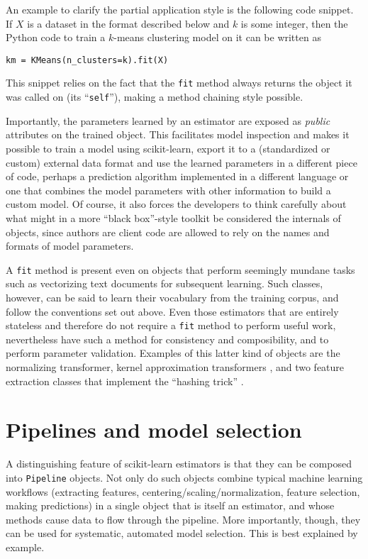 \documentclass[a4paper]{article}
\begin{document}
An example to clarify the partial application style
is the following code snippet.
If $X$ is a dataset in the format described below and $k$ is some integer,
then the Python code to train a $k$-means clustering model on it
can be written as
\begin{verbatim}
km = KMeans(n_clusters=k).fit(X)
\end{verbatim}
This snippet relies on the fact that the \texttt{fit} method
always returns the object it was called on (its ``\texttt{self}''),
making a method chaining style possible.

Importantly, the parameters learned by an estimator
are exposed as \textit{public} attributes on the trained object.
This facilitates model inspection
and makes it possible to train a model using scikit-learn,
export it to a (standardized or custom) external data format
and use the learned parameters in a different piece of code,
perhaps a prediction algorithm implemented in a different language
or one that combines the model parameters with other information
to build a custom model.
Of course, it also forces the developers to think carefully
about what might in a more ``black box''-style toolkit
be considered the internals of objects,
since authors are client code are allowed to rely
on the names and formats of model parameters.

A \texttt{fit} method is present even on objects
that perform seemingly mundane tasks such as vectorizing text documents
for subsequent learning.
Such classes, however, can be said to learn their vocabulary
from the training corpus,
and follow the conventions set out above.
Even those estimators that are entirely stateless and therefore
do not require a \texttt{fit} method to perform useful work,
nevertheless have such a method for consistency and composibility,
and to perform parameter validation.
Examples of this latter kind of objects are the normalizing transformer,
kernel approximation transformers
\citep{rahimi2007random, li2010random, vedaldi2010efficient},
and two feature extraction classes that implement the ``hashing trick''
\citep{weinberger2009}.

\section{Pipelines and model selection}

A distinguishing feature of scikit-learn estimators
is that they can be composed into \texttt{Pipeline} objects.
Not only do such objects combine typical machine learning workflows
(extracting features, centering/scaling/normalization,
feature selection, making predictions)
in a single object that is itself an estimator,
and whose methods cause data to flow through the pipeline.
More importantly, though, they can be used for
systematic, automated model selection.
This is best explained by example.
\end{document}
